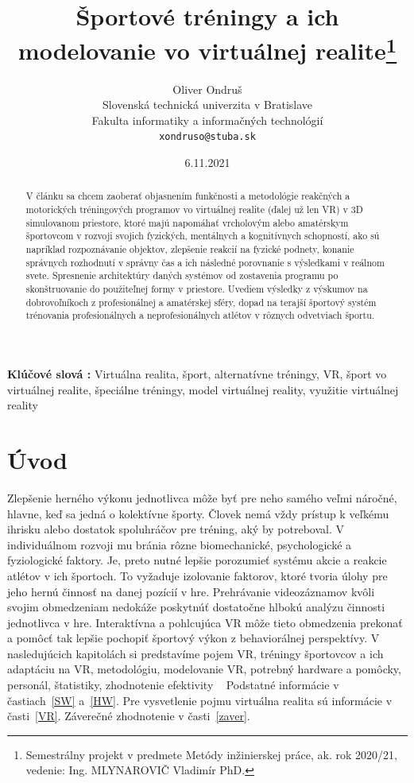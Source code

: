 \documentclass[10pt,twoside,slovak,a4paper]{article}										%
\title{Športové tréningy a ich modelovanie vo virtuálnej realite\thanks{Semestrálny projekt v predmete Metódy inžinierskej práce, ak. rok 2020/21, vedenie: Ing. MLYNAROVIČ Vladimír  PhD.}}
\author{Oliver Ondruš\\[2pt]
	{\small Slovenská technická univerzita v Bratislave}\\
	{\small Fakulta informatiky a informačných technológií}\\
	{\small \texttt{xondruso@stuba.sk}}
	}
\date{\small 6.11.2021}
\begin{document}
\maketitle

\begin{abstract}
V článku sa chcem zaoberať objasnením funkčnosti a metodológie reakčných a motorických tréningových programov vo virtuálnej realite (ďalej už len VR) v 3D simulovanom priestore, ktoré majú napomáhať vrcholovým alebo amatérskym športovcom v rozvoji svojich fyzických, mentálnych a kognitívnych schopností, ako sú napríklad rozpoznávanie objektov, zlepšenie reakcií na fyzické podnety, konanie správnych rozhodnutí v správny čas a ich následné porovnanie s výsledkami v reálnom svete. Spresnenie architektúry daných systémov od zostavenia programu po skonštruovanie do použiteľnej formy v priestore. Uvediem výsledky z výskumov na dobrovoľníkoch z profesionálnej a amatérskej sféry, dopad na terajší športový systém trénovania profesionálnych a neprofesionálnych atlétov v rôznych odvetviach športu.
\end{abstract}
\textbf{Klúčové slová :}
Virtuálna realita, šport, alternatívne tréningy, VR, šport vo virtuálnej realite, špeciálne tréningy, model virtuálnej reality, využitie virtuálnej reality

\section{Úvod}
Zlepšenie herného výkonu jednotlivca môže byť pre neho samého veľmi náročné, hlavne, keď sa jedná o kolektívne športy. Človek nemá vždy prístup k veľkému ihrisku alebo dostatok spoluhráčov pre tréning, aký by potreboval. V individuálnom rozvoji mu bránia rôzne biomechanické, psychologické a fyziologické faktory. Je, preto nutné lepšie porozumieť systému akcie a reakcie atlétov v ich športoch. To vyžaduje izolovanie faktorov, ktoré tvoria úlohy pre jeho hernú činnosť na danej pozícií v hre. Prehrávanie videozáznamov kvôli svojim obmedzeniam nedokáže poskytnúť dostatočne hlbokú analýzu činnosti jednotlivca v hre. Interaktívna a pohlcujúca VR môže tieto obmedzenia prekonať a pomôcť tak lepšie pochopiť športový výkon z behaviorálnej perspektívy. V nasledujúcich kapitolách si predstavíme pojem VR, tréningy športovcov a ich adaptáciu na VR, metodológiu, modelovanie VR, potrebný hardware a pomôcky, personál, štatistiky, zhodnotenie efektivity ~\cite{Hlavny:zdroj}
Podstatné informácie v častiach~\ref{SW} a~\ref{HW}. Pre vysvetlenie pojmu virtuálna realita sú informácie v časti~\ref{VR}. 
Záverečné zhodnotenie v časti~\ref{zaver}.
  
\end{document}
